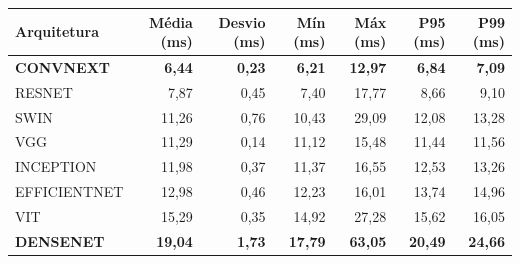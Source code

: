 \begin{tabular}{lrrrrrr}
\toprule
Arquitetura & Média (ms) & Desvio (ms) & Mín (ms) & Máx (ms) & P95 (ms) & P99 (ms) \\
\midrule
\textbf{CONVNEXT} & \textbf{6,44} & \textbf{0,23} & \textbf{6,21} & \textbf{12,97} & \textbf{6,84} & \textbf{7,09} \\
RESNET & 7,87 & 0,45 & 7,40 & 17,77 & 8,66 & 9,10 \\
SWIN & 11,26 & 0,76 & 10,43 & 29,09 & 12,08 & 13,28 \\
VGG & 11,29 & 0,14 & 11,12 & 15,48 & 11,44 & 11,56 \\
INCEPTION & 11,98 & 0,37 & 11,37 & 16,55 & 12,53 & 13,26 \\
EFFICIENTNET & 12,98 & 0,46 & 12,23 & 16,01 & 13,74 & 14,96 \\
VIT & 15,29 & 0,35 & 14,92 & 27,28 & 15,62 & 16,05 \\
\textbf{DENSENET} & \textbf{19,04} & \textbf{1,73} & \textbf{17,79} & \textbf{63,05} & \textbf{20,49} & \textbf{24,66} \\
\bottomrule
\end{tabular}